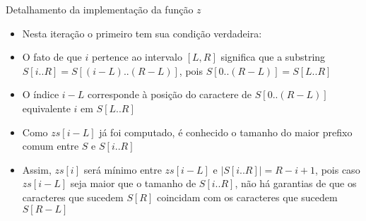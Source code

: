 \begin{frame}[fragile]{Detalhamento da implementação da função $z$}

    \begin{itemize}
        \item Nesta iteração o primeiro  tem sua condição verdadeira: 

        \vspace{0.1in}
        \vspace{0.1in}
        \pause

        \item O fato de que $i$ pertence ao intervalo $[L, R]$ significa que a substring 
            $S[i..R] = S[(i-L)..(R-L)]$, pois $S[0..(R-L)] = S[L..R]$
        \pause

        \item O índice $i-L$ corresponde à posição do caractere de $S[0..(R-L)]$ equivalente 
            $i$ em $S[L..R]$
        \pause

        \item Como $zs[i-L]$ já foi computado, é conhecido o tamanho do maior prefixo comum entre 
            $S$ e $S[i..R]$
        \pause

        \item Assim, $zs[i]$ será  mínimo entre $zs[i-L]$ e $|S[i..R]| = R-i+1$, pois caso 
            $zs[i-L]$ seja maior que o tamanho de $S[i..R]$, não há garantias de que os caracteres
            que sucedem $S[R]$ coincidam com os caracteres que sucedem $S[R-L]$

    \end{itemize}

\end{frame}


